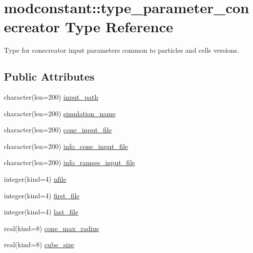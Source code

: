 \hypertarget{structmodconstant_1_1type__parameter__conecreator}{\section{modconstant\-:\-:type\-\_\-parameter\-\_\-conecreator Type Reference}
\label{structmodconstant_1_1type__parameter__conecreator}
}


Type for conecreator input parameters common to particles and cells versions.  


\subsection*{Public Attributes}
\begin{DoxyCompactItemize}
\item 
character(len=200) \hyperlink{structmodconstant_1_1type__parameter__conecreator_ac382f8cfe1347c4242bded522f3206df}{input\-\_\-path}
\item 
character(len=200) \hyperlink{structmodconstant_1_1type__parameter__conecreator_af7518143511653280193e1cd3ecacb8c}{simulation\-\_\-name}
\item 
character(len=200) \hyperlink{structmodconstant_1_1type__parameter__conecreator_a2bdd6648e859eb4c798e2298fe6647b1}{cone\-\_\-input\-\_\-file}
\item 
character(len=200) \hyperlink{structmodconstant_1_1type__parameter__conecreator_a5f8f89332e28a5774a6bc136b842cdd9}{info\-\_\-cone\-\_\-input\-\_\-file}
\item 
character(len=200) \hyperlink{structmodconstant_1_1type__parameter__conecreator_aa2e7ccb48f0190fad5e9900b5b1b4d63}{info\-\_\-ramses\-\_\-input\-\_\-file}
\item 
integer(kind=4) \hyperlink{structmodconstant_1_1type__parameter__conecreator_aed8367ffd7693e23e246b114eb3eef88}{nfile}
\item 
integer(kind=4) \hyperlink{structmodconstant_1_1type__parameter__conecreator_a2378ef5e20c6ff83414d69b9c19c0bbd}{first\-\_\-file}
\item 
integer(kind=4) \hyperlink{structmodconstant_1_1type__parameter__conecreator_a23caca71a8dc1b330de47e8a6873012e}{last\-\_\-file}
\item 
real(kind=8) \hyperlink{structmodconstant_1_1type__parameter__conecreator_a86915502305c5da4d6eec7273448f947}{cone\-\_\-max\-\_\-radius}
\item 
real(kind=8) \hyperlink{structmodconstant_1_1type__parameter__conecreator_a5123eeb98fd44cbe5ce7b83c97441108}{cube\-\_\-size}
\end{DoxyCompactItemize}


